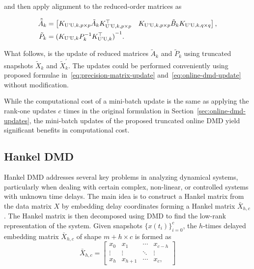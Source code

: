 and then apply alignment to the reduced-order matrices as

\begin{align}
    \tilde{\bar{A}}_k & = \begin{bmatrix} K _{\text{U'U}, k, p \times p} \tilde{A}_k K _{\text{U'U}, k, p \times p}^\top & K _{\text{U'U}, k, p \times p} \tilde{B}_k K _{\text{U'U}, k, q \times q} \end{bmatrix} , \\
    \tilde{P}_k       & = {(K _{\text{U'U}, k} P_k^{-1} K _{\text{U'U}, k}^\top)}^{-1}.
\end{align}


What follows, is the update of reduced matrices \(\tilde{A}_k\) and \(\tilde{P}_k\) using truncated snapshots \(\tilde{X}_k\) and \(\tilde{X}^\prime_k\). The updates could be performed conveniently using proposed formulae in~\eqref{eq:precision-matrix-update} and~\eqref{eq:online-dmd-update} without modification.

While the computational cost of a mini-batch update is the same as applying the rank-one updates \(c\) times in the original formulation in Section~\ref{sec:online-dmd-updates}, the mini-batch updates of the proposed truncated online DMD yield significant benefits in computational cost.

\subsection{Hankel DMD}\label{sec:hankel-dmd}
Hankel DMD addresses several key problems in analyzing dynamical systems, particularly when dealing with certain complex, non-linear, or controlled systems with unknown time delays. The main idea is to construct a Hankel matrix from the data matrix \(X\) by embedding delay coordinates forming a Hankel matrix \(\bar{X}_{h, c}\). The Hankel matrix is then decomposed using DMD to find the low-rank representation of the system. Given snapshots \({\{x(t_i)\}}^c_{i=0}\), the \(h\)-times delayed embedding matrix \(\bar{X}_{h, c}\) of shape \(m + h \times c\) is formed as
\begin{equation}\label{eq:hankel}
    \bar{X}_{h, c} = \begin{bmatrix}
        x_0    & x_1       & \cdots & x_{c - h} \\
        \vdots & \vdots    & \ddots & \vdots    \\
        x_{h}  & x_{h + 1} & \cdots & x_{c},
    \end{bmatrix}
\end{equation}

